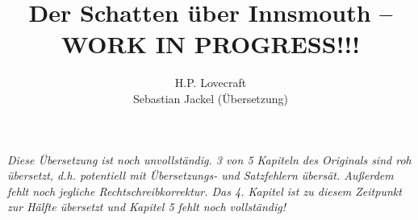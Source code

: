 \documentclass[a4paper]{memoir}
\begin{document}
\title{Der Schatten über Innsmouth -- WORK IN PROGRESS!!!}
\author{H.P. Lovecraft\\
		Sebastian Jackel (Übersetzung)}
\date{}
\maketitle

\textit{Diese Übersetzung ist noch unvollständig. 3 von 5 Kapiteln des Originals sind roh übersetzt, d.h. potentiell mit Übersetzungs- und Satzfehlern übersät. Außerdem fehlt noch jegliche Rechtschreibkorrektur. Das 4. Kapitel ist zu diesem Zeitpunkt zur Hälfte übersetzt und Kapitel 5 fehlt noch vollständig!}





\end{document}
